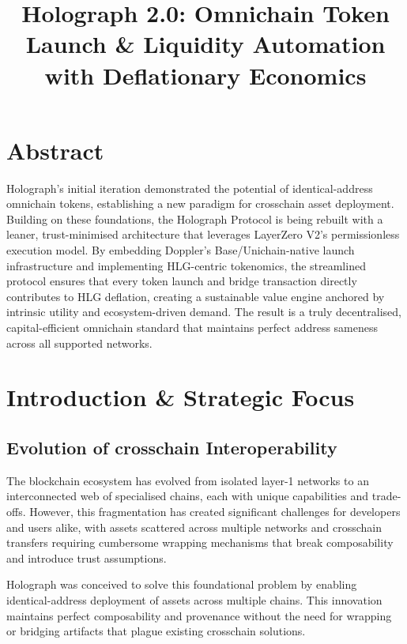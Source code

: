 \documentclass[10pt,a4paper,twocolumn]{article}
\title{Holograph 2.0: Omnichain Token Launch \& Liquidity Automation with Deflationary Economics}
\author{}
\date{}
\begin{document}
\maketitle

\section*{Abstract}
Holograph's initial iteration demonstrated the potential of identical-address omnichain tokens, establishing a new paradigm for crosschain asset deployment. Building on these foundations, the Holograph Protocol is being rebuilt with a leaner, trust-minimised architecture that leverages LayerZero V2's permissionless execution model. By embedding Doppler's Base/Unichain-native launch infrastructure and implementing HLG-centric tokenomics, the streamlined protocol ensures that every token launch and bridge transaction directly contributes to HLG deflation, creating a sustainable value engine anchored by intrinsic utility and ecosystem-driven demand. The result is a truly decentralised, capital-efficient omnichain standard that maintains perfect address sameness across all supported networks.

\section{Introduction \& Strategic Focus}
\subsection{Evolution of crosschain Interoperability}
The blockchain ecosystem has evolved from isolated layer-1 networks to an interconnected web of specialised chains, each with unique capabilities and trade-offs. However, this fragmentation has created significant challenges for developers and users alike, with assets scattered across multiple networks and crosschain transfers requiring cumbersome wrapping mechanisms that break composability and introduce trust assumptions.

Holograph was conceived to solve this foundational problem by enabling identical-address deployment of assets across multiple chains. This innovation maintains perfect composability and provenance without the need for wrapping or bridging artifacts that plague existing crosschain solutions.
\end{document}
